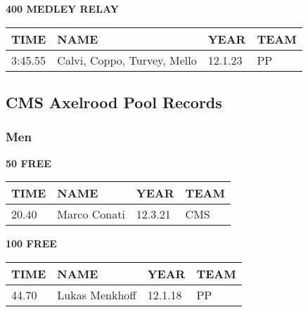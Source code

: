 \vspace{0.4cm}

\begin{center}
\begin{minipage}[t]{0.7\textwidth}
\centering
\textbf{400 MEDLEY RELAY}\\[0.05cm]
\begin{tabular}{@{}p{1.8cm}p{2.8cm}p{1.2cm}p{1.4cm}@{}}
\hline
\textbf{TIME} & \textbf{NAME} & \textbf{YEAR} & \textbf{TEAM} \\
\hline
3:45.55 & Calvi, Coppo, Turvey, Mello & 12.1.23 & PP \\
\hline
\end{tabular}
\end{minipage}
\end{center}

\vspace{0.4cm}

\newpage

\subsection{CMS Axelrood Pool Records}
\subsubsection{Men}

\begin{minipage}[t]{0.48\textwidth}
\centering
\textbf{50 FREE}\\[0.05cm]
\begin{tabular}{@{}p{1.8cm}p{2.8cm}p{1.2cm}p{1.4cm}@{}}
\hline
\textbf{TIME} & \textbf{NAME} & \textbf{YEAR} & \textbf{TEAM} \\
\hline
20.40 & Marco Conati & 12.3.21 & CMS \\
\hline
\end{tabular}
\end{minipage}\hfill
\begin{minipage}[t]{0.48\textwidth}
\centering
\textbf{100 FREE}\\[0.05cm]
\begin{tabular}{@{}p{1.8cm}p{2.8cm}p{1.2cm}p{1.4cm}@{}}
\hline
\textbf{TIME} & \textbf{NAME} & \textbf{YEAR} & \textbf{TEAM} \\
\hline
44.70 & Lukas Menkhoff & 12.1.18 & PP \\
\hline
\end{tabular}
\end{minipage}

\vspace{0.4cm}

